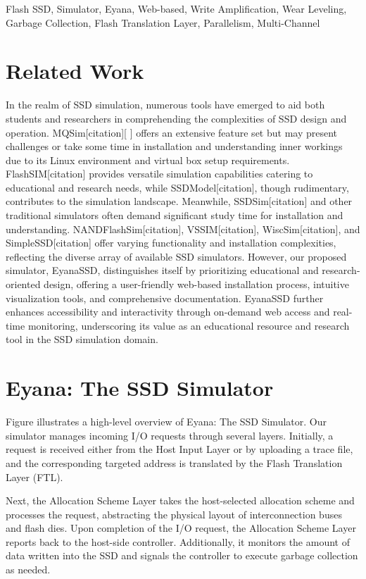 \documentclass[conference]{IEEEtran}
\begin{document}
\begin{IEEEkeywords}
Flash SSD, Simulator, Eyana, Web-based, Write Amplification, Wear Leveling, Garbage Collection, Flash Translation Layer, Parallelism, Multi-Channel
\end{IEEEkeywords}


\section{Related Work}
In the realm of SSD simulation, numerous tools have emerged to aid both students and researchers in comprehending the complexities of SSD design and operation. MQSim[citation][ ] offers an extensive feature set but may present challenges or take some time in installation and understanding  inner workings  due to its Linux environment and virtual box setup requirements. FlashSIM[citation] provides versatile simulation capabilities catering to educational and research needs, while SSDModel[citation], though rudimentary, contributes to the simulation landscape. Meanwhile, SSDSim[citation] and other traditional simulators often demand significant study time for installation and understanding. NANDFlashSim[citation], VSSIM[citation], WiscSim[citation], and SimpleSSD[citation] offer varying functionality and installation complexities, reflecting the diverse array of available SSD simulators. However, our proposed simulator, EyanaSSD,  distinguishes itself by prioritizing educational and research-oriented design, offering a user-friendly web-based installation process, intuitive visualization tools, and comprehensive documentation. EyanaSSD further enhances accessibility and interactivity through on-demand web access and real-time monitoring, underscoring its value as an educational resource and research tool in the SSD simulation domain.

\section{Eyana: The SSD Simulator}
Figure  illustrates a high-level overview of Eyana: The SSD Simulator. Our simulator manages incoming I/O requests through several layers. Initially, a request is received either from the Host Input Layer or by uploading a trace file, and the corresponding targeted address is translated by the Flash Translation Layer (FTL).

Next, the Allocation Scheme Layer takes the host-selected allocation scheme and processes the request, abstracting the physical layout of interconnection buses and flash dies. Upon completion of the I/O request, the Allocation Scheme Layer reports back to the host-side controller. Additionally, it monitors the amount of data written into the SSD and signals the controller to execute garbage collection as needed.
\end{document}
